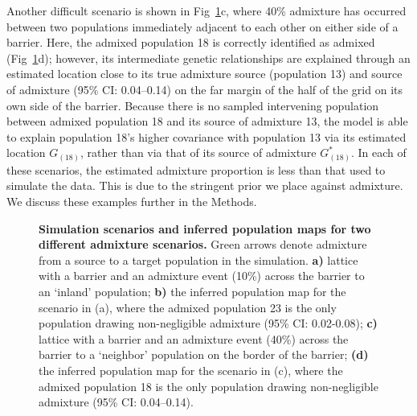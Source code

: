 \documentclass[10pt,letterpaper]{article}
\newcommand{\kadmixsource}[1]{{$G^{*}_{#1}$}}
\begin{document}
Another difficult scenario is shown in Fig\ \ref{sfig:barr_inland_ad}c,
where 40\% admixture has occurred between two populations immediately adjacent to each other on either side of a barrier.  
Here, the admixed population 18 is correctly identified as admixed (Fig\ \ref{sfig:barr_inland_ad}d); 
however, its intermediate genetic relationships are explained through an estimated location close to its true admixture source (population 13)
and source of admixture (95\% CI: 0.04--0.14) on the far margin of the half of the grid on its own side of the barrier.
Because there is no sampled intervening population between admixed population 18 and its source of admixture 13, 
the model is able to explain population 18's higher covariance with population 13 via its estimated location $G_{(18)}$, 
rather than via that of its source of admixture \kadmixsource{(18)}.  
In each of these scenarios, the estimated admixture proportion is less than that used to simulate the data.  This is due to the stringent prior we place against admixture.  We discuss these examples further in the Methods.
%
\begin{figure}[ht!]
\begin{center}
\end{center}
\caption{
\textbf{Simulation scenarios and inferred population maps for two different admixture scenarios.}
	Green arrows denote admixture from a source to a target population in the simulation.
	\textbf{a)} 
	lattice with a barrier and an admixture event (10\%) across the barrier to an `inland' population; 
	\textbf{b)}
	the inferred population map for the scenario in (a),
	where the admixed population 23 is the only population drawing 
	non-negligible admixture (95\% CI: 0.02-0.08); 
	\textbf{c)} lattice with a barrier and an admixture event (40\%) across the barrier
	 to a `neighbor' population on the border of the barrier; 
	 \textbf{(d)} the inferred population map for the scenario in (c), 
	 where the admixed population 18 is the only population drawing 
	 non-negligible admixture (95\% CI: 0.04--0.14).
}\label{sfig:barr_inland_ad}
\end{figure}
\end{document}
